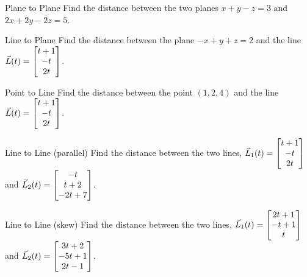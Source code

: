 \begin{exercise}{Plane to Plane}
Find the distance between the two planes $x+y-z=3$ and $2x+2y-2z=5$.
\end{exercise}

\begin{exercise}{Line to Plane}
Find the distance between the plane $-x+y+z=2$ and the line $\vec{L}(t)=\begin{bmatrix}t+1\\-t\\2t\end{bmatrix}$.
\end{exercise}

\begin{exercise}{Point to Line}
Find the distance between the point $(1,2,4)$ and the line $\vec{L}(t)=\begin{bmatrix}t+1\\-t\\2t\end{bmatrix}$.
\end{exercise}

\begin{exercise}{Line to Line (parallel)}
Find the distance between the two lines, $\vec{L}_1(t)=\begin{bmatrix}t+1\\-t\\2t\end{bmatrix}$ and $\vec{L}_2(t)=\begin{bmatrix}-t\\t+2\\-2t+7\end{bmatrix}$.
\end{exercise}

\begin{exercise}{Line to Line (skew)}
Find the distance between the two lines, $\vec{L}_1(t)=\begin{bmatrix}2t+1\\-t+1\\t\end{bmatrix}$ and $\vec{L}_2(t)=\begin{bmatrix}3t+2\\-5t+1\\2t-1\end{bmatrix}$.
\end{exercise}
\renewcommand\thesubsection{\thesection.\arabic{subsection}}